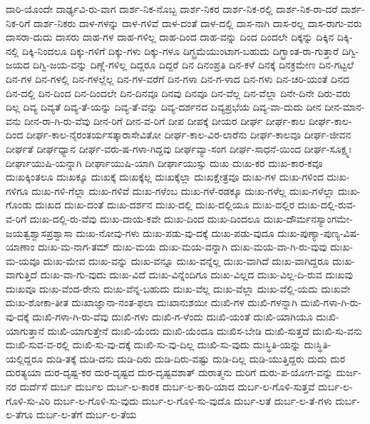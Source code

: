 {ದಾರಿ-ಯೊಂದೇ
ದಾರ್ಢ್ಯವಿ-ರು-ವಾಗ
ದಾರ್ಶ-ನಿಕ-ನೊಬ್ಬ
ದಾರ್ಶ-ನಿಕರ
ದಾರ್ಶ-ನಿಕ-ರಲ್ಲಿ
ದಾರ್ಶ-ನಿಕ-ರಾ-ದರೆ
ದಾರ್ಶ-ನಿಕ-ರಿಗೆ
ದಾರ್ಶ-ನಿಕರು
ದಾಳ-ಗಳನ್ನು
ದಾಳ-ಗಳಿವೆ
ದಾಳ-ದಂತೆ
ದಾಳ-ದಲ್ಲಿ
ದಾಸ-ನಾಗಿ
ದಾಸ-ರಲ್ಲ
ದಾಸ-ರಾಗು-ವರು
ದಾಸರಾ-ದುದು
ದಾಸರು
ದಾಹ-ಗಳ
ದಾಹ-ಗಳಿಲ್ಲ
ದಾಹ-ದಿಂದ
ದಾಹ-ವನ್ನು
ದಿಂದ
ದಿಂದಲೇ
ದಿಕ್ಕನ್ನು
ದಿಕ್ಕಿನ
ದಿಕ್ಕಿ-ನಲ್ಲಿ
ದಿಕ್ಕಿ-ನಿಂದಲೂ
ದಿಕ್ಕು-ಗಳಿಗೆ
ದಿಕ್ಕು-ಗಳು
ದಿಕ್ಕು-ಗಳೂ
ದಿಗ್ಬ್ರಮೆಯುಂಟಾಗ-ಬಹುದು
ದಿಗ್ಭ್ರಾಂತ-ರಾ-ಗುತ್ತಾರೆ
ದಿಗ್ವಿ-ಜಯದ
ದಿಗ್ವಿ-ಜಯ-ವನ್ನು
ದಿಣ್ಣೆ-ಗಳಿಲ್ಲ
ದಿದ್ದರೂ
ದಿದ್ದರೆ
ದಿನ
ದಿನಂಪ್ರತಿ
ದಿನ-ಕಳೆ
ದಿನಕ್ಕೆ
ದಿನಕ್ರಮೇಣ
ದಿನ-ಗಟ್ಟಲೆ
ದಿನ-ಗಳ
ದಿನ-ಗಳಲ್ಲಿ
ದಿನ-ಗಳಲ್ಲೆಲ್ಲ
ದಿನ-ಗಳ-ವರೆಗೆ
ದಿನ-ಗಳಾ
ದಿನ-ಗ-ಳಾದ
ದಿನ-ಗಳು
ದಿನ-ಚರಿ-ಯಂತೆ
ದಿನದ
ದಿನ-ದಲ್ಲಿ
ದಿನ-ದಿಂದ
ದಿನ-ದಿಂದಲೇ
ದಿನ-ದಿನವೂ
ದಿನವು
ದಿನವೂ
ದಿನ-ವೆಲ್ಲ
ದಿನ-ವೆಲ್ಲಾ
ದಿನೇ-ದಿನೇ
ದಿರು-ವರು
ದಿಲ್ಲ
ದಿವ್ಯ
ದಿವ್ಯತೆ
ದಿವ್ಯ-ತೆ-ಯನ್ನು
ದಿವ್ಯ-ತೆ-ವನ್ನು
ದಿವ್ಯ-ದರ್ಶನದ
ದಿವ್ಯಪ್ರಭೆಯ
ದಿವ್ಯ-ವಾ-ದುದು
ದೀನ
ದೀನ-ಮಾನ-ವನು
ದೀನ-ರಾ-ಗಿ-ರು-ವೆವು
ದೀನ-ರಿಗೆ
ದೀನ-ವ-ರಿಗೆ
ದೀಪ
ದೀಪಕ್ಕೆ
ದೀಯರ
ದೀರ್ಘ
ದೀರ್ಘ-ಕಾಲ
ದೀರ್ಘ-ಕಾಲ-ದಿಂದ
ದೀರ್ಘ-ಕಾಲ-ನೈರಂತರ್ಯಸತ್ಕಾರಾಸೇವಿತೋ
ದೀರ್ಘ-ಕಾಲ-ವಿರ-ಲಾರೆನು
ದೀರ್ಘ-ಕಾಲವೂ
ದೀರ್ಘ-ಜೀವನ
ದೀರ್ಘತೆ
ದೀರ್ಘಧ್ಯಾನ
ದೀರ್ಘ-ವರು-ಷ-ಗಳಾ-ಗಿದ್ದವು
ದೀರ್ಘವ್ಯಾ-ಸಂಗ
ದೀರ್ಘ-ಸಾಧನೆ-ಯಿಂದ
ದೀರ್ಘ-ಸೂಕ್ಷ್ಮಃ
ದೀರ್ಘಾಯುಷಿ-ಯನ್ನಾಗಿ
ದೀರ್ಘಾಯುಷಿ-ಯಾಗಿ
ದೀರ್ಘಾಯುಸ್ಸು
ದುಃಖ
ದುಃಖ-ಕರ
ದುಃಖ-ಕಾರ-ಕವೂ
ದುಃಖಕ್ಕಿಂತಲೂ
ದುಃಖಕ್ಕೂ
ದುಃಖಕ್ಕೆ
ದುಃಖಕ್ಕೆಲ್ಲ
ದುಃಖಕ್ಕೆಲ್ಲಾ
ದುಃಖಕ್ಷೇತ್ರವೂ
ದುಃಖ-ಗಳ
ದುಃಖ-ಗಳಿಂದ
ದುಃಖ-ಗಳಿಗೂ
ದುಃಖ-ಗಳಿ-ಗೆಲ್ಲಾ
ದುಃಖ-ಗಳಿವೆ
ದುಃಖ-ಗಳೆಂಬ
ದುಃಖ-ಗಳೆ-ರಡಕ್ಕೂ
ದುಃಖ-ಗಳೆಲ್ಲ
ದುಃಖ-ಗಳೆಲ್ಲಾ
ದುಃಖ-ಗೊಂಡು
ದುಃಖದ
ದುಃಖ-ದಂತೆ
ದುಃಖ-ದರ್ಶನ
ದುಃಖ-ದಲ್ಲಿ
ದುಃಖ-ದಲ್ಲಿಯೂ
ದುಃಖ-ದಲ್ಲಿರ
ದುಃಖ-ದಲ್ಲಿ-ರುವ-ವ-ರಿಗೆ
ದುಃಖ-ದಲ್ಲಿ-ರು-ವೆವು
ದುಃಖ-ದಾಯ-ಕವೇ
ದುಃಖ-ದಿಂದ
ದುಃಖ-ದಿಂದಲೂ
ದುಃಖ-ದೌರ್ಮನಸ್ಯಾಂಗಮೇ-ಜಯತ್ವಶ್ವಾಸಪ್ರಶ್ವಾಸಾ
ದುಃಖ-ನೋವು-ಗಳು
ದುಃಖ-ಪಡು-ವು-ದಕ್ಕೆ
ದುಃಖ-ಪಡು-ವುದೂ
ದುಃಖ-ಪುಣ್ಯಾ-ಪುಣ್ಯ-ವಿಷ-ಯಾಣಾಂ
ದುಃಖ-ಮ-ನಾಗ-ತಮ್
ದುಃಖ-ಮಯ
ದುಃಖ-ಮಯ-ವನ್ನಾಗಿ
ದುಃಖ-ಮಯ-ವಾ-ಗಿ-ರು-ವುವು
ದುಃಖ-ಮ-ಯವೂ
ದುಃಖ-ಮೇವ
ದುಃಖ-ವನ್ನು
ದುಃಖ-ವನ್ನೂ
ದುಃಖ-ವನ್ನೆಲ್ಲ
ದುಃಖ-ವಾಗಿದೆ
ದುಃಖ-ವಾಗಿದ್ದರೂ
ದುಃಖ-ವಾಗುತ್ತಿದೆ
ದುಃಖ-ವಾ-ಗು-ವುದು
ದುಃಖ-ವಿದೆ
ದುಃಖ-ವಿನ್ನೆಂದಿಗೂ
ದುಃಖ-ವಿಲ್ಲದ
ದುಃಖ-ವಿಲ್ಲ-ದಿ-ರುವ
ದುಃಖವು
ದುಃಖವೂ
ದುಃಖ-ವೆಂದ-ರೇನು
ದುಃಖ-ವೆನ್ನ-ಬಹುದು
ದುಃಖ-ವೆಲ್ಲ
ದುಃಖ-ವೆಲ್ಲಾ
ದುಃಖ-ವೆಲ್ಲಿ-ಯದು
ದುಃಖವೇ
ದುಃಖ-ಶೋಕಾ-ತೀತ
ದುಃಖಾಜ್ಞಾನಾ-ನಂತ-ಫಲಾ
ದುಃಖಾನುಶಯೀ
ದುಃಖಿ-ಗಳ
ದುಃಖಿ-ಗಳನ್ನಾಗಿ
ದುಃಖಿ-ಗಳಾ-ಗಿ-ರು-ವು-ದಕ್ಕೆ
ದುಃಖಿ-ಗಳಾ-ಗಿ-ರು-ವೆವು
ದುಃಖಿ-ಗಳು
ದುಃಖಿ-ಗ-ಳೆಂದು
ದುಃಖಿ-ಯಂತೆ
ದುಃಖಿ-ಯಾಗಿಯೂ
ದುಃಖಿ-ಯಾಗುತ್ತಾನೆ
ದುಃಖಿ-ಯಾಗುತ್ತೇನೆ
ದುಃಖಿ-ಯೆಂದು
ದುಃಖಿ-ಯೆಂದೂ
ದುಃಖಿಸ-ಬೇಡಿ
ದುಃಖಿ-ಸುತ್ತದೆ
ದುಃಖಿ-ಸು-ವನು
ದುಃಖಿ-ಸುವ-ವ-ರಲ್ಲಿ
ದುಃಖಿ-ಸು-ವು-ದಕ್ಕೆ
ದುಃಖಿ-ಸು-ವು-ದಿಲ್ಲ
ದುಃಖಿ-ಸು-ವುದು
ದುಃಸ್ಥಿತಿ-ಯನ್ನು
ದುಃಸ್ಥಿತಿ-ಯಲ್ಲಿದ್ದರೂ
ದುಡಿ-ತಕ್ಕೆ
ದುಡಿ-ದನು
ದುಡಿ-ದಿರು
ದುಡಿ-ದಿರು-ವಷ್ಟು
ದುಡಿ-ದಿಲ್ಲ
ದುಡಿ-ಯುತ್ತಿದ್ದರು
ದುದು
ದುರ
ದುರತ್ಯಯಾ
ದುರ-ದೃಷ್ಟ-ಕರ
ದುರ-ದೃಷ್ಟದ
ದುರ-ದೃಷ್ಟವಶಾತ್
ದುರಾತ್ಮನು
ದುರಿಗೆ
ದುರು-ಪ-ಯೋಗ-ವನ್ನು
ದುರ್ಜ-ನರ
ದುರ್ದೆಸೆ
ದುರ್ಬ
ದುರ್ಬಲ
ದುರ್ಬ-ಲ-ಕಾರಕ
ದುರ್ಬ-ಲ-ಕಾರಿ-ಯಾದ
ದುರ್ಬ-ಲ-ಗೊಳಿ-ಸುತ್ತವೆ
ದುರ್ಬ-ಲ-ಗೊಳಿ-ಸು-ವಿರಿ
ದುರ್ಬ-ಲ-ಗೊಳಿ-ಸು-ವುದು
ದುರ್ಬ-ಲ-ಗೊಳಿ-ಸು-ವುದೊ
ದುರ್ಬ-ಲತೆ
ದುರ್ಬ-ಲ-ತೆ-ಗಳು
ದುರ್ಬ-ಲ-ತೆಗೂ
ದುರ್ಬ-ಲ-ತೆಗೆ
ದುರ್ಬ-ಲ-ತೆಯ
}
